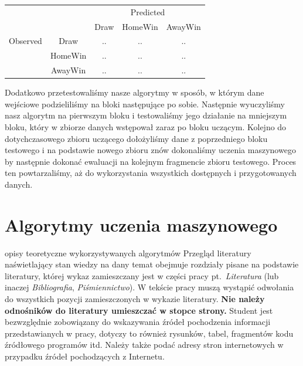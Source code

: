 \begin{center}
\renewcommand{\arraystretch}{1.5}
\begin{tabular}{|c|c|c|c|c|}
   \cline{3-5} 
   \multicolumn{1}{c}{} & & \multicolumn{3}{c|}{Predicted} \\ \cline{3-5}
   \multicolumn{1}{c}{} & & Draw & HomeWin & AwayWin \\ \hline
   
   {Observed}
   & Draw & .. & .. & ..  \\ \cline{2-5}
   & HomeWin & .. & .. & ..  \\ \cline{2-5}
   & AwayWin & .. & .. & .. \\ \hline
\end{tabular}
\end{center}
Dodatkowo przetestowaliśmy nasze algorytmy w sposób, w którym dane wejściowe podzieliliśmy na bloki następujące po sobie. Następnie wyuczyliśmy nasz algorytm na pierwszym bloku i testowaliśmy jego działanie na mniejszym bloku, który w zbiorze danych wstępował zaraz po bloku uczącym. Kolejno do dotychczasowego zbioru uczącego dołożyliśmy dane z poprzedniego bloku testowego i na podstawie nowego zbioru znów dokonaliśmy uczenia maszynowego by następnie dokonać ewaluacji na kolejnym fragmencie zbioru testowego. Proces ten powtarzaliśmy, aż do wykorzystania wszystkich dostępnych i przygotowanych danych.
\newpage

\section{Algorytmy uczenia maszynowego}
opisy teoretyczne wykorzystywanych algorytmów
Przegląd literatury naświetlający stan wiedzy na dany temat obejmuje rozdziały pisane na podstawie
literatury, której wykaz zamieszczany jest w części pracy pt.~\emph{Literatura} (lub inaczej \emph{Bibliografia},
\emph{Piśmiennictwo}). W tekście pracy muszą wystąpić odwołania do wszystkich pozycji zamieszczonych w
wykazie literatury. \textbf{Nie należy odnośników do literatury umieszczać w stopce strony.} Student jest
bezwzględnie zobowiązany do wskazywania źródeł pochodzenia informacji przedstawianych w pracy,
dotyczy to również rysunków, tabel, fragmentów kodu źródłowego programów itd. Należy także podać
adresy stron internetowych w przypadku źródeł pochodzących z Internetu. 


